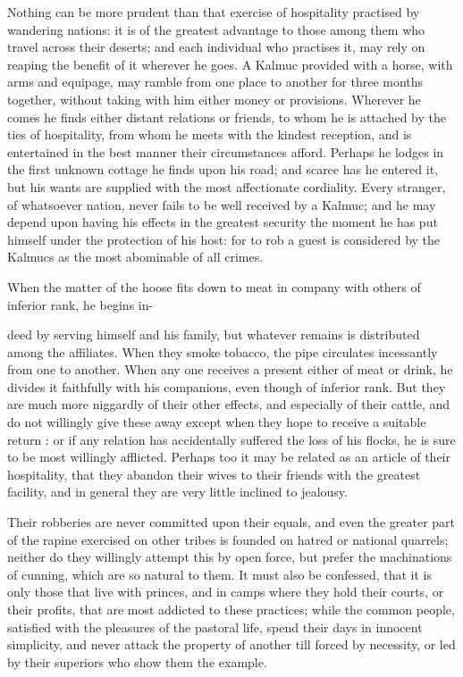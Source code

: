 \documentclass{article}
\begin{document}
Nothing can be more prudent than that exercise of hospitality practised by wandering nations: it is of the greatest advantage to those among them who travel across their deserts; and each individual who practises it, may rely on reaping the benefit of it wherever he goes. A Kalmuc provided with a horse, with arms and equipage, may ramble from one place to another for three months together, without taking with him either money or provisions. Wherever he comes he finds either distant relations or friends, to whom he is attached by the ties of hospitality, from whom he meets with the kindest reception, and is entertained in the best manner their circumstances afford. Perhaps he lodges in the first unknown cottage he finds upon his road; and scarce has he entered it, but his wants are supplied with the most affectionate cordiality. Every stranger, of whatsoever nation, never fails to be well received by a Kalmuc; and he may depend upon having his effects in the greatest security the moment he has put himself under the protection of his host: for to rob a guest is considered by the Kalmucs as the most abominable of all crimes.

When the matter of the hoose fits down to meat in company with others of inferior rank, he begins in-

deed by serving himself and his family, but whatever remains is distributed among the affiliates. When they smoke tobacco, the pipe circulates incessantly from one to another. When any one receives a present either of meat or drink, he divides it faithfully with his companions, even though of inferior rank. But they are much more niggardly of their other effects, and especially of their cattle, and do not willingly give these away except when they hope to receive a suitable return : or if any relation has accidentally suffered the loss of his flocks, he is sure to be most willingly afflicted. Perhaps too it may be related as an article of their hospitality, that they abandon their wives to their friends with the greatest facility, and in general they are very little inclined to jealousy.

Their robberies are never committed upon their equals, and even the greater part of the rapine exercised on other tribes is founded on hatred or national quarrels; neither do they willingly attempt this by open force, but prefer the machinations of cunning, which are so natural to them. It must also be confessed, that it is only those that live with princes, and in camps where they hold their courts, or their profits, that are most addicted to these practices; while the common people, satisfied with the pleasures of the pastoral life, spend their days in innocent simplicity, and never attack the property of another till forced by necessity, or led by their superiors who show them the example.
\end{document}
